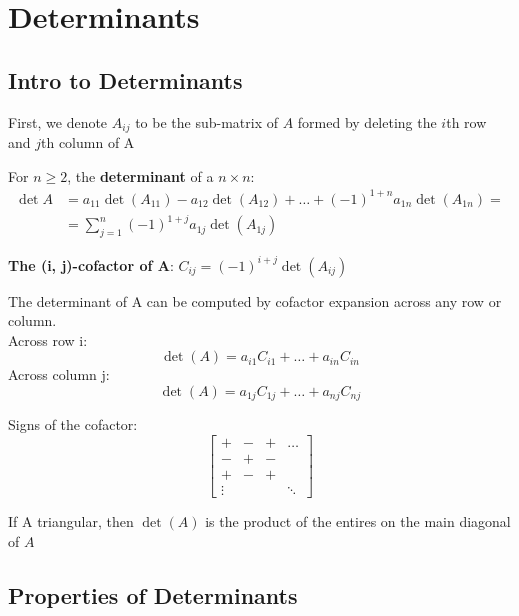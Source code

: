\documentclass{report}
\begin{document}
\chapter{Determinants}
\section{Intro to Determinants}
\setcounter{theorem}{0}
\setcounter{definition}{0}

First, we denote $A_{ij}$ to be the sub-matrix of $A$ formed by deleting the $i$th row and $j$th column of A

\begin{definition}
For $n \ge 2$, the \textbf{determinant} of a $n \times n$: \[
\begin{array}{rlr}
    \det A &= a_{11} \det(A_{11}) - a_{12} \det(A_{12}) + \ldots + (-1)^{1+n} a_{1n} \det(A_{1n}) = \\    
    &= \sum_{j = 1}^{n}(-1)^{1+j}a_{1j}\det(A_{1j})
\end{array}
\]
\end{definition}

\textbf{The (i, j)-cofactor of A}: $C_{ij} = (-1)^{i+j}\det(A_{ij})$

\begin{theorem}
    The determinant of A can be computed by cofactor expansion across any row or column.\\
    Across row i:
    \[
    \det(A) = a_{i1}C_{i1} + \ldots + a_{in}C_{in}
    \]
    Across column j:
    \[
    \det(A) = a_{1j}C_{1j} + \ldots + a_{nj}C_{nj}
    \]
\end{theorem}

Signs of the cofactor:
\[
\begin{bmatrix}
    + & - & + & \ldots \\
    - & + & - & \\
    + & - & + & \\
    \vdots & & & \ddots
\end{bmatrix}
\]

\begin{theorem}
    If A triangular, then $\det(A)$ is the product of the entires on the main diagonal of $A$
\end{theorem}

\section{Properties of Determinants}
\end{document}
